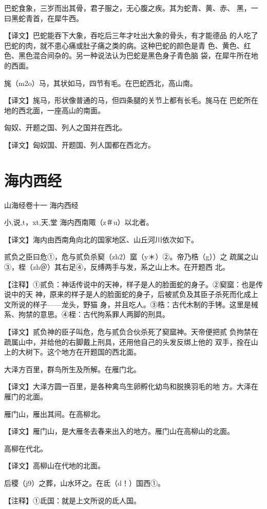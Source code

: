 \documentclass[a4paper,12pt,UTF8,twoside]{ctexbook}
\begin{document}
巴蛇食象，三岁而出其骨，君子服之，无心腹之疾。其为蛇青、黄、赤、 黑，一曰黑蛇青首，在犀牛西。

【译文】巴蛇能吞下大象，吞吃后三年才吐出大象的骨头，有才能德品 的人吃了巴蛇的肉，就不患心痛或肚子痛之类的病。这种巴蛇的颜色是青 色、黄色、红色、黑色混合间杂的。另一种说法认为巴蛇是黑色身子青色脑 袋，在犀牛所在地的西面。

旄（m2o）马，其状如马，四节有毛。在巴蛇西北，高山南。

【译文】旄马，形状像普通的马，但四条腿的关节上都有长毛。旄马在 巴蛇所在地的西北面，一座高山的南面。

匈奴、开题之国、列人之国并在西北。

【译文】匈奴国、开题国、列人国都在西北方。

\chapter{海内西经}

山海经卷十一 海内西经

小,说,t，xt,天,堂
海内西南陬（z＃u）以北者。

【译文】海内由西南角向北的国家地区、山丘河川依次如下。

贰负之臣曰危①，危与贰负杀窫（zh2）窳（y＊）②。帝乃梏（g））之 疏属之山③，桎（zh＠）其右足④，反缚两手与发，系之山上木。在开题西 北。

【注释】①贰负：神话传说中的天神，样子是人的脸面蛇的身子。②窫窳：也是传说中的天 神，原来的样子是人的脸面蛇的身子，后被贰负及其臣子杀死而化成上文所说的样子——龙头，野猫 身，并且吃人。③梏：古代木制的手铐。这里是械系、拘禁的意思。④桎：古代拘系罪人两脚的刑具。

【译文】贰负神的臣子叫危，危与贰负合伙杀死了窫窳神。天帝便把贰 负拘禁在疏属山中，并给他的右脚戴上刑具，还用他自己的头发反绑上他的 双手，拴在山上的大树下。这个地方在开题国的西北面。

大泽方百里，群鸟所生及所解。在雁门北。

【译文】大泽方圆一百里，是各种禽鸟生卵孵化幼鸟和脱换羽毛的地 方。大泽在雁门的北面。

雁门山，雁出其间。在高柳北。

【译文】雁门山，是大雁冬去春来出入的地方。雁门山在高柳山的北面。

高柳在代北。

【译文】高柳山在代地的北面。

后稷（j9）之葬，山水环之。在氐（d！）国西①。

【注释】①氐国：就是上文所说的氐人国。
\end{document}
